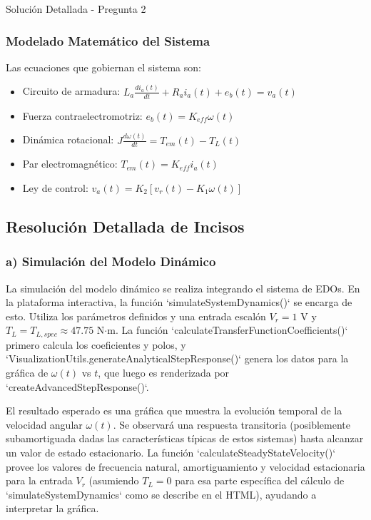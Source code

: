 \documentclass[12pt]{article}
\begin{document}
\begin{solutionbox}{Solución Detallada - Pregunta 2}
\subsubsection*{Modelado Matemático del Sistema}
Las ecuaciones que gobiernan el sistema son:
\begin{itemize}
    \item Circuito de armadura: $L_a \frac{di_a(t)}{dt} + R_a i_a(t) + e_b(t) = v_a(t)$
    \item Fuerza contraelectromotriz: $e_b(t) = K_{eff} \omega(t)$
    \item Dinámica rotacional: $J \frac{d\omega(t)}{dt} = T_{em}(t) - T_L(t)$
    \item Par electromagnético: $T_{em}(t) = K_{eff} i_a(t)$
    \item Ley de control: $v_a(t) = K_2 [v_r(t) - K_1 \omega(t)]$
\end{itemize}

\subsection*{Resolución Detallada de Incisos}

\subsubsection*{a) Simulación del Modelo Dinámico}
La simulación del modelo dinámico se realiza integrando el sistema de EDOs. En la plataforma interactiva, la función `simulateSystemDynamics()` se encarga de esto. Utiliza los parámetros definidos y una entrada escalón $V_r = 1$ V y $T_L = T_{L,spec} \approx 47.75$ N$\cdot$m. La función `calculateTransferFunctionCoefficients()` primero calcula los coeficientes y polos, y `VisualizationUtils.generateAnalyticalStepResponse()` genera los datos para la gráfica de $\omega(t)$ vs $t$, que luego es renderizada por `createAdvancedStepResponse()`.

El resultado esperado es una gráfica que muestra la evolución temporal de la velocidad angular $\omega(t)$. Se observará una respuesta transitoria (posiblemente subamortiguada dadas las características típicas de estos sistemas) hasta alcanzar un valor de estado estacionario. La función `calculateSteadyStateVelocity()` provee los valores de frecuencia natural, amortiguamiento y velocidad estacionaria para la entrada $V_r$ (asumiendo $T_L=0$ para esa parte específica del cálculo de `simulateSystemDynamics` como se describe en el HTML), ayudando a interpretar la gráfica.


\end{solutionbox}
\end{document}
